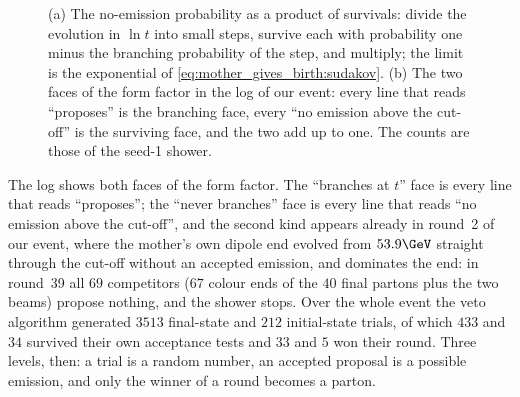 \begin{figure}[htbp]\centering
\resizebox{\textwidth}{!}{}
\caption[The Sudakov form factor as a product of survival probabilities, and its two faces in the log]{(a) The no-emission probability as a product of survivals: divide the evolution in $\ln t$ into small steps, survive each with probability one minus the branching probability of the step, and multiply; the limit is the exponential of \cref{eq:mother_gives_birth:sudakov}. (b) The two faces of the form factor in the  log of our event: every line that reads ``proposes'' is the branching face, every ``no emission above the cut-off'' is the surviving face, and the two add up to one. The counts are those of the seed-1 shower.}
\label{fig:mother_gives_birth:sudakov_sketch}
\end{figure}

The log shows both faces of the form factor. The ``branches at $t$'' face
is every line that reads ``proposes''; the ``never branches'' face is every
line that reads ``no emission above the cut-off'', and the second kind
appears already in round~2 of our event, where the mother's own dipole end
evolved from $53.9\GeV$ straight through the cut-off without an accepted
emission, and dominates the end: in round~39 all $69$ competitors ($67$
colour ends of the $40$ final partons plus the two beams) propose nothing,
and the shower stops. Over the whole event the veto algorithm generated
$3513$ final-state and $212$ initial-state trials, of which $433$ and $34$
survived their own acceptance tests and $33$ and $5$ won their round. Three
levels, then: a trial is a random number, an accepted proposal is a
possible emission, and only the winner of a round becomes a parton.

